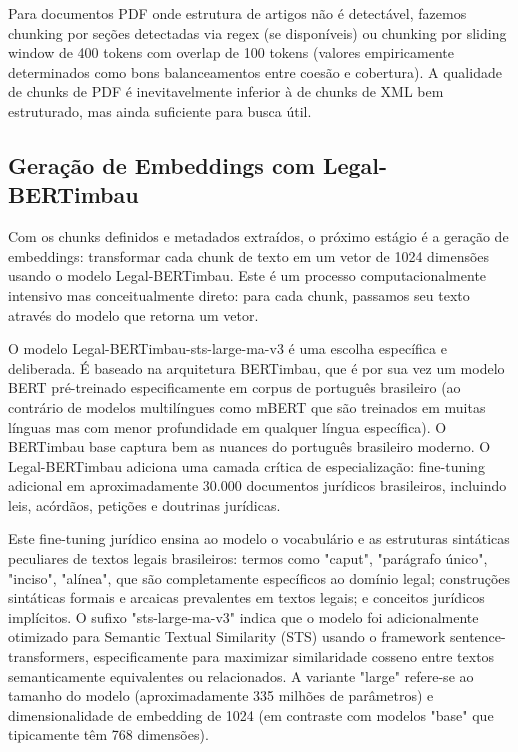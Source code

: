 \documentclass[12pt,a4paper]{article}
\begin{document}
Para documentos PDF onde estrutura de artigos não é detectável, fazemos chunking por seções detectadas via regex (se disponíveis) ou chunking por sliding window de 400 tokens com overlap de 100 tokens (valores empiricamente determinados como bons balanceamentos entre coesão e cobertura). A qualidade de chunks de PDF é inevitavelmente inferior à de chunks de XML bem estruturado, mas ainda suficiente para busca útil.

\subsection{Geração de Embeddings com Legal-BERTimbau}

Com os chunks definidos e metadados extraídos, o próximo estágio é a geração de embeddings: transformar cada chunk de texto em um vetor de 1024 dimensões usando o modelo Legal-BERTimbau. Este é um processo computacionalmente intensivo mas conceitualmente direto: para cada chunk, passamos seu texto através do modelo que retorna um vetor.

O modelo Legal-BERTimbau-sts-large-ma-v3 é uma escolha específica e deliberada. É baseado na arquitetura BERTimbau, que é por sua vez um modelo BERT pré-treinado especificamente em corpus de português brasileiro (ao contrário de modelos multilíngues como mBERT que são treinados em muitas línguas mas com menor profundidade em qualquer língua específica). O BERTimbau base captura bem as nuances do português brasileiro moderno. O Legal-BERTimbau adiciona uma camada crítica de especialização: fine-tuning adicional em aproximadamente 30.000 documentos jurídicos brasileiros, incluindo leis, acórdãos, petições e doutrinas jurídicas.

Este fine-tuning jurídico ensina ao modelo o vocabulário e as estruturas sintáticas peculiares de textos legais brasileiros: termos como "caput", "parágrafo único", "inciso", "alínea", que são completamente específicos ao domínio legal; construções sintáticas formais e arcaicas prevalentes em textos legais; e conceitos jurídicos implícitos. O sufixo "sts-large-ma-v3" indica que o modelo foi adicionalmente otimizado para Semantic Textual Similarity (STS) usando o framework sentence-transformers, especificamente para maximizar similaridade cosseno entre textos semanticamente equivalentes ou relacionados. A variante "large" refere-se ao tamanho do modelo (aproximadamente 335 milhões de parâmetros) e dimensionalidade de embedding de 1024 (em contraste com modelos "base" que tipicamente têm 768 dimensões).
\end{document}
